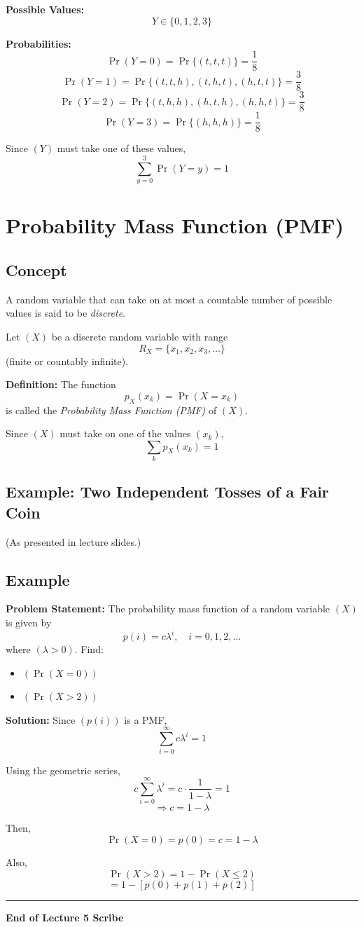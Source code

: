 \documentclass[12pt]{article}
\begin{document}
\textbf{Possible Values:}
\[
Y \in \{0, 1, 2, 3\}
\]

\textbf{Probabilities:}
\[
\Pr(Y = 0) = \Pr\{(t,t,t)\} = \frac{1}{8}
\]
\[
\Pr(Y = 1) = \Pr\{(t,t,h),(t,h,t),(h,t,t)\} = \frac{3}{8}
\]
\[
\Pr(Y = 2) = \Pr\{(t,h,h),(h,t,h),(h,h,t)\} = \frac{3}{8}
\]
\[
\Pr(Y = 3) = \Pr\{(h,h,h)\} = \frac{1}{8}
\]

Since $( Y )$ must take one of these values,
\[
\sum_{y=0}^{3} \Pr(Y = y) = 1
\]

\section{Probability Mass Function (PMF)}

\subsection{Concept}

A random variable that can take on at most a countable number of possible values is said to be \textit{discrete}.

Let $( X )$ be a discrete random variable with range
\[
R_X = \{x_1, x_2, x_3, \dots\}
\]
(finite or countably infinite).

\textbf{Definition:}  
The function
\[
p_X(x_k) = \Pr(X = x_k)
\]
is called the \textit{Probability Mass Function (PMF)} of $( X )$.

Since $( X )$ must take on one of the values $( x_k )$,
\[
\sum_k p_X(x_k) = 1
\]

\subsection{Example: Two Independent Tosses of a Fair Coin}

(As presented in lecture slides.)

\subsection{Example}

\textbf{Problem Statement:}  
The probability mass function of a random variable $( X )$ is given by
\[
p(i) = c \lambda^i, \quad i = 0,1,2,\dots
\]
where $( \lambda > 0 )$. Find:
\begin{itemize}
    \item $( \Pr(X = 0) )$
    \item $( \Pr(X > 2) )$
\end{itemize}

\textbf{Solution:}  
Since $( p(i) )$ is a PMF,
\[
\sum_{i=0}^{\infty} c \lambda^i = 1
\]

Using the geometric series,
\[
c \sum_{i=0}^{\infty} \lambda^i = c \cdot \frac{1}{1 - \lambda} = 1
\]
\[
\Rightarrow c = 1 - \lambda
\]

Then,
\[
\Pr(X = 0) = p(0) = c = 1 - \lambda
\]

Also,
\[
\Pr(X > 2) = 1 - \Pr(X \le 2)
\]
\[
= 1 - [p(0) + p(1) + p(2)]
\]

\hrule
\begin{center}
\textbf{End of Lecture 5 Scribe}
\end{center}
\end{document}

